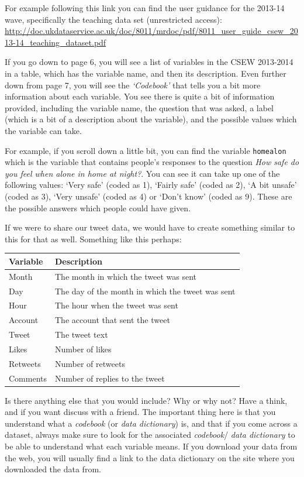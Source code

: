 \documentclass[
]{book}
\begin{document}
For example following this link you can find the user guidance for the 2013-14 wave, specifically the teaching data set (unrestricted access): \url{http://doc.ukdataservice.ac.uk/doc/8011/mrdoc/pdf/8011_user_guide_csew_2013-14_teaching_dataset.pdf}

If you go down to page 6, you will see a list of variables in the CSEW 2013-2014 in a table, which has the variable name, and then its description. Even further down from page 7, you will see the \emph{`Codebook'} that tells you a bit more information about each variable. You see there is quite a bit of information provided, including the variable name, the question that was asked, a label (which is a bit of a description about the variable), and the possible values which the variable can take.

For example, if you scroll down a little bit, you can find the variable \texttt{homealon} which is the variable that contains people's responses to the question \emph{How safe do you feel when alone in home at night?}. You can see it can take up one of the following values: `Very safe' (coded as 1), `Fairly safe' (coded as 2), `A bit unsafe' (coded as 3), `Very unsafe' (coded as 4) or `Don't know' (coded as 9). These are the possible answers which people could have given.

If we were to share our tweet data, we would have to create something similar to this for that as well. Something like this perhaps:

\begin{tabular}{l|l}
\hline
Variable & Description\\
\hline
Month & The month in which the tweet was sent\\
\hline
Day & The day of the month in which the tweet was sent\\
\hline
Hour & The hour when the tweet was sent\\
\hline
Account & The account that sent the tweet\\
\hline
Tweet & The tweet text\\
\hline
Likes & Number of likes\\
\hline
Retweets & Number of retweets\\
\hline
Comments & Number of replies to the tweet\\
\hline
\end{tabular}

Is there anything else that you would include? Why or why not? Have a think, and if you want discuss with a friend. The important thing here is that you understand what a \emph{codebook} (or \emph{data dictionary}) is, and that if you come across a dataset, always make sure to look for the associated \emph{codebook}/ \emph{data dictionary} to be able to understand what each variable means. If you download your data from the web, you will usually find a link to the data dictionary on the site where you downloaded the data from.
\end{document}
